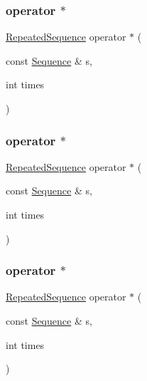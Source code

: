 \subsubsection{\texorpdfstring{operator $\ast$}{operator *}\hspace{0.1cm}{\footnotesize\ttfamily [7/18]}}
{\footnotesize\ttfamily \mbox{\hyperlink{classfakeit_1_1RepeatedSequence}{Repeated\+Sequence}} operator $\ast$ (\begin{DoxyParamCaption}\item[{const \mbox{\hyperlink{classfakeit_1_1Sequence}{Sequence}} \&}]{s,  }\item[{int}]{times }\end{DoxyParamCaption})\hspace{0.3cm}{\ttfamily [friend]}}

\mbox{\label{classfakeit_1_1RepeatedSequence_ab856dedd10fec617583599e03f3c9a80}} 
\subsubsection{\texorpdfstring{operator $\ast$}{operator *}\hspace{0.1cm}{\footnotesize\ttfamily [8/18]}}
{\footnotesize\ttfamily \mbox{\hyperlink{classfakeit_1_1RepeatedSequence}{Repeated\+Sequence}} operator $\ast$ (\begin{DoxyParamCaption}\item[{const \mbox{\hyperlink{classfakeit_1_1Sequence}{Sequence}} \&}]{s,  }\item[{int}]{times }\end{DoxyParamCaption})\hspace{0.3cm}{\ttfamily [friend]}}

\mbox{\label{classfakeit_1_1RepeatedSequence_ab856dedd10fec617583599e03f3c9a80}} 
\subsubsection{\texorpdfstring{operator $\ast$}{operator *}\hspace{0.1cm}{\footnotesize\ttfamily [9/18]}}
{\footnotesize\ttfamily \mbox{\hyperlink{classfakeit_1_1RepeatedSequence}{Repeated\+Sequence}} operator $\ast$ (\begin{DoxyParamCaption}\item[{const \mbox{\hyperlink{classfakeit_1_1Sequence}{Sequence}} \&}]{s,  }\item[{int}]{times }\end{DoxyParamCaption})\hspace{0.3cm}{\ttfamily [friend]}}

